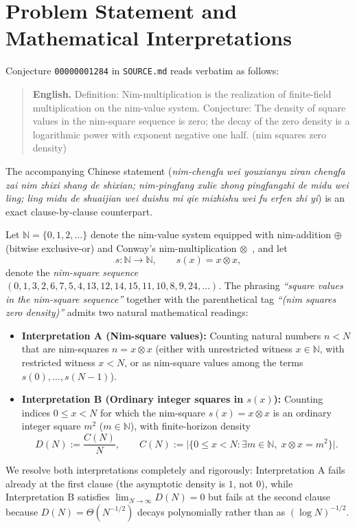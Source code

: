 \documentclass[11pt]{article}
\theoremstyle{definition}
\theoremstyle{remark}
\newcommand{\nimadd}{\oplus}
\newcommand{\nimmul}{\otimes}
\newcommand{\N}{\mathbb{N}}
\begin{document}
\section{Problem Statement and Mathematical Interpretations}

Conjecture \texttt{00000001284} in \texttt{SOURCE.md} reads verbatim as follows:
\begin{quote}
\textbf{English.} Definition: Nim-multiplication is the realization of finite-field multiplication on the nim-value system. Conjecture: The density of square values in the nim-square sequence is zero; the decay of the zero density is a logarithmic power with exponent negative one half. (nim squares zero density)
\end{quote}
The accompanying Chinese statement (\emph{nim-chengfa wei youxianyu ziran chengfa zai nim zhixi shang de shixian; nim-pingfang xulie zhong pingfangzhi de midu wei ling; ling midu de shuaijian wei duishu mi qie mizhishu wei fu erfen zhi yi}) is an exact clause-by-clause counterpart.

Let $\N = \{0, 1, 2, \dots\}$ denote the nim-value system equipped with nim-addition $\nimadd$ (bitwise exclusive-or) and Conway's nim-multiplication $\nimmul$~\cite{ConwayONAG,LenstraNim}, and let
\[
  s : \N \longrightarrow \N, \qquad s(x) = x \nimmul x,
\]
denote the \emph{nim-square sequence} $(0, 1, 3, 2, 6, 7, 5, 4, 13, 12, 14, 15, 11, 10, 8, 9, 24, \dots)$. The phrasing \emph{``square values in the nim-square sequence''} together with the parenthetical tag \emph{``(nim squares zero density)''} admits two natural mathematical readings:
\begin{itemize}
  \item \textbf{Interpretation A (Nim-square values):} Counting natural numbers $n < N$ that are nim-squares $n = x \nimmul x$ (either with unrestricted witness $x \in \N$, with restricted witness $x < N$, or as nim-square values among the terms $s(0), \dots, s(N-1)$).
  \item \textbf{Interpretation B (Ordinary integer squares in $s(x)$):} Counting indices $0 \le x < N$ for which the nim-square $s(x) = x \nimmul x$ is an ordinary integer square $m^2$ ($m \in \N$), with finite-horizon density
  \[
    D(N) := \frac{C(N)}{N}, \qquad C(N) := \bigl|\{0 \le x < N : \exists m \in \N,\; x \nimmul x = m^2\}\bigr|.
  \]
\end{itemize}

We resolve both interpretations completely and rigorously: Interpretation A fails already at the first clause (the asymptotic density is $1$, not $0$), while Interpretation B satisfies $\lim_{N \to \infty} D(N) = 0$ but fails at the second clause because $D(N) = \Theta(N^{-1/2})$ decays polynomially rather than as $(\log N)^{-1/2}$.
\end{document}
